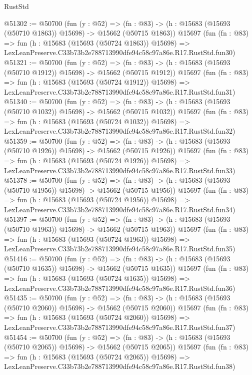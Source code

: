 \begin{lexlean}{RustStd}
\begin{coremodule}
@51302 := @50700
    (fun (y : @52) =>
    (fn : @83) -> (h : @15683 (@15693 (@50710 @1863)) @15698) -> @15662 (@50715 @1863))
    @15697
    (fun (fn : @83) =>
    fun (h : @15683 (@15693 (@50724 @1863)) @15698) =>
    LexLeanPreserve.C33b73b2e788713990dfe94c58c97a86e.R17.RustStd.fun30)
@51321 := @50700
    (fun (y : @52) =>
    (fn : @83) -> (h : @15683 (@15693 (@50710 @1912)) @15698) -> @15662 (@50715 @1912))
    @15697
    (fun (fn : @83) =>
    fun (h : @15683 (@15693 (@50724 @1912)) @15698) =>
    LexLeanPreserve.C33b73b2e788713990dfe94c58c97a86e.R17.RustStd.fun31)
@51340 := @50700
    (fun (y : @52) =>
    (fn : @83) -> (h : @15683 (@15693 (@50710 @1032)) @15698) -> @15662 (@50715 @1032))
    @15697
    (fun (fn : @83) =>
    fun (h : @15683 (@15693 (@50724 @1032)) @15698) =>
    LexLeanPreserve.C33b73b2e788713990dfe94c58c97a86e.R17.RustStd.fun32)
@51359 := @50700
    (fun (y : @52) =>
    (fn : @83) -> (h : @15683 (@15693 (@50710 @1926)) @15698) -> @15662 (@50715 @1926))
    @15697
    (fun (fn : @83) =>
    fun (h : @15683 (@15693 (@50724 @1926)) @15698) =>
    LexLeanPreserve.C33b73b2e788713990dfe94c58c97a86e.R17.RustStd.fun33)
@51378 := @50700
    (fun (y : @52) =>
    (fn : @83) -> (h : @15683 (@15693 (@50710 @1956)) @15698) -> @15662 (@50715 @1956))
    @15697
    (fun (fn : @83) =>
    fun (h : @15683 (@15693 (@50724 @1956)) @15698) =>
    LexLeanPreserve.C33b73b2e788713990dfe94c58c97a86e.R17.RustStd.fun34)
@51397 := @50700
    (fun (y : @52) =>
    (fn : @83) -> (h : @15683 (@15693 (@50710 @1963)) @15698) -> @15662 (@50715 @1963))
    @15697
    (fun (fn : @83) =>
    fun (h : @15683 (@15693 (@50724 @1963)) @15698) =>
    LexLeanPreserve.C33b73b2e788713990dfe94c58c97a86e.R17.RustStd.fun35)
@51416 := @50700
    (fun (y : @52) =>
    (fn : @83) -> (h : @15683 (@15693 (@50710 @1635)) @15698) -> @15662 (@50715 @1635))
    @15697
    (fun (fn : @83) =>
    fun (h : @15683 (@15693 (@50724 @1635)) @15698) =>
    LexLeanPreserve.C33b73b2e788713990dfe94c58c97a86e.R17.RustStd.fun36)
@51435 := @50700
    (fun (y : @52) =>
    (fn : @83) -> (h : @15683 (@15693 (@50710 @2060)) @15698) -> @15662 (@50715 @2060))
    @15697
    (fun (fn : @83) =>
    fun (h : @15683 (@15693 (@50724 @2060)) @15698) =>
    LexLeanPreserve.C33b73b2e788713990dfe94c58c97a86e.R17.RustStd.fun37)
@51454 := @50700
    (fun (y : @52) =>
    (fn : @83) -> (h : @15683 (@15693 (@50710 @2065)) @15698) -> @15662 (@50715 @2065))
    @15697
    (fun (fn : @83) =>
    fun (h : @15683 (@15693 (@50724 @2065)) @15698) =>
    LexLeanPreserve.C33b73b2e788713990dfe94c58c97a86e.R17.RustStd.fun38)

\end{coremodule}
\end{lexlean}
